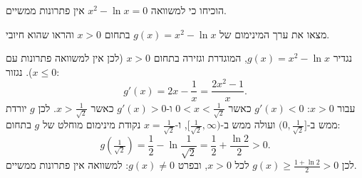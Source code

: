 
\begin{question}
הוכיחו כי למשוואה $x^2-\ln x=0$ אין פתרונות ממשיים.
\end{question}

\begin{hint}
מצאו את ערך המינימום של $g(x)=x^2-\ln x$ בתחום $x>0$ והראו שהוא חיובי.
\end{hint}

\begin{solution}
נגדיר $g(x)=x^2-\ln x$, המוגדרת וגזירה בתחום $x>0$ (לכן אין למשוואה פתרונות עם $x\le0$). נגזור:
\[ g'(x)=2x-\frac1x=\frac{2x^2-1}{x}. \]
עבור $x>0$: $g'(x)<0$ כאשר $0<x<\frac{1}{\sqrt2}$ ו-$g'(x)>0$ כאשר $x>\frac1{\sqrt2}$. לכן $g$ יורדת ממש ב-$(0,\frac1{\sqrt2}]$ ועולה ממש ב-$[\frac1{\sqrt2},\infty)$, ו-$x=\frac1{\sqrt2}$ נקודת מינימום מוחלט של $g$ בתחום:
\[ g\!\left(\tfrac1{\sqrt2}\right)=\frac12-\ln\frac1{\sqrt2}=\frac12+\frac{\ln2}{2}>0. \]
לכן $g(x)\ge\frac{1+\ln 2}{2}>0$ לכל $x>0$, ובפרט $g(x)\ne0$: למשוואה אין פתרונות ממשיים.
\end{solution}
